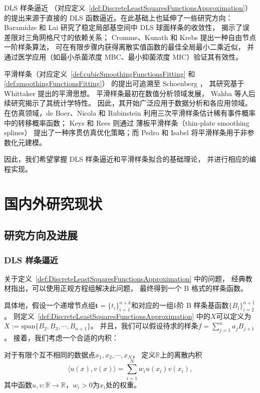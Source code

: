 DLS 样条逼近
（对应定义~\ref{def:DiscreteLeastSquaresFunctionsApproximation}）
的提出来源于直接的 DLS 函数逼近。在此基础上也延伸了一些研究方向：
Baramidze 和 Lai \cite{BARAMIDZE20111091}
研究了稳定局部基空间中 DLS 球面样条的收敛性，
揭示了误差限对三角网格尺寸的依赖关系；
Cromme、Kunath 和 Krebs \cite{Cromme2017DiscreteAB}
提出一种自由节点一阶样条算法，
可在有限步骤内获得离散实值函数的最佳全局最小二乘近似，
并通过医学应用（如最小杀菌浓度 MBC、最小抑菌浓度 MIC）验证其有效性。

平滑样条（对应定义~\ref{def:cubicSmoothingFunctionsFitting} 和
\ref{def:smoothingFunctionsFitting}）
的提出可追溯至 Schoenberg \cite{Schoenberg1964}，
其研究基于 Whittaker \cite{Whittaker1922}提出的平滑思想。
平滑样条最初在数值分析领域发展，
Wahba \cite{Wahba1990}等人后续研究揭示了其统计学特性。
因此，其开始广泛应用于数据分析和各应用领域。
在仿真领域，de Boer、Nicola 和 Rubinstein \cite{deBoer2000AdaptiveIS}
利用三次平滑样条估计稀有事件概率中的转移概率函数；
Keys 和 Rees \cite{Keys2004ASM}则通过
薄板平滑样条（thin-plate smoothing splines）
提出了一种序贯仿真优化策略；而 Pedro 和 Isabel \cite{Santos2010}
将平滑样条用于非参数化元建模。

因此，我们希望掌握 DLS 样条逼近和平滑样条拟合的基础理论，
并进行相应的编程实现。

\section{国内外研究现状}

\subsection{研究方向及进展}

\subsubsection{ DLS 样条逼近}
关于定义~\ref{def:DiscreteLeastSquaresFunctionsApproximation} 中的问题，
经典教材\cite{GuideToSplines}指出，可以使用正规方程组解决此问题，
最终得到一个 B 格式的样条函数。

具体地，假设一个递增节点组$\mathbf{t}=\{t_{i}\}_{i=1}^{n+k}$和对应的一组$k$阶
B 样条基函数$\{B_{i}\}_{i=2}^{n+1}$。
则定义~\ref{def:DiscreteLeastSquaresFunctionsApproximation} 中的$X$可以定义为
$X:=\text{span}\{B_{2},B_{3},\cdots,B_{n+1}\}$。
并且，我们可以假设待求的样条$f=\sum_{j=1}^{n}a_{j}B_{j+1}$。
接着，我们考虑一个合适的内积：
\begin{defn}[离散内积]
  \label{def:DiscreteInnerProduct}
  对于有限个互不相同的数据点$x_{1},x_{2},\cdots,x_{N}$，
  定义$\mathbb{R}$上的离散内积
  \begin{equation}
    \label{eq:DiscreteInnerProduct}
    \langle u(x),v(x)\rangle
    =\sum_{i=1}^{N}w_{i}u(x_{i})v(x_{i}),
  \end{equation}
  其中函数$u,v:\mathbb{R}\to \mathbb{R}$，$w_{i}>0$为$x_{i}$处的权重。
\end{defn}

